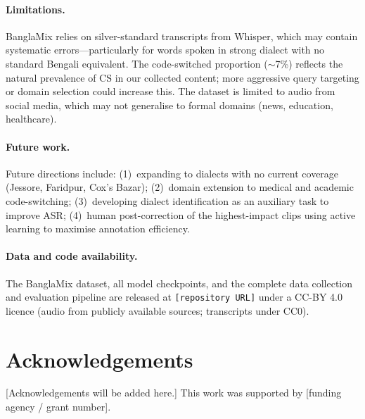 \paragraph{Limitations.}
BanglaMix relies on silver-standard transcripts from Whisper, which may
contain systematic errors---particularly for words spoken in strong dialect
with no standard Bengali equivalent.
The code-switched proportion ($\sim$7\%) reflects the natural prevalence of
CS in our collected content; more aggressive query targeting or domain
selection could increase this.
The dataset is limited to audio from social media, which may not generalise
to formal domains (news, education, healthcare).

\paragraph{Future work.}
Future directions include: (1)~expanding to dialects with no current
coverage (Jessore, Faridpur, Cox's Bazar); (2)~domain extension to medical
and academic code-switching; (3)~developing dialect identification as an
auxiliary task to improve ASR; (4)~human post-correction of the highest-impact
clips using active learning to maximise annotation efficiency.

\paragraph{Data and code availability.}
The BanglaMix dataset, all model checkpoints, and the complete data collection
and evaluation pipeline are released at \texttt{[repository URL]} under a
CC-BY 4.0 licence (audio from publicly available sources; transcripts under
CC0).

\section*{Acknowledgements}

[Acknowledgements will be added here.]
This work was supported by [funding agency / grant number].
